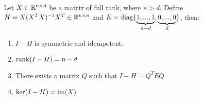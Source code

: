 \begin{lemma} \label{lem:projection properties}
    Let $X \in \mathbb{R}^{n \times d}$ be a matrix of full rank, where $n > d$. Define $H = X (X^TX)^{-1}X^T \in \mathbb{R}^{n \times n}$ and $E = \operatorname{diag} \{\underbrace{1, ..., 1}_{n - d}, \underbrace{0, ..., 0}_{d}\}$, then:
    \begin{enumerate}[label=Property \thelemma.\arabic*, align=left]
        \item \label{prop:idempotent symmetric} $I - H$ is symmetric and idempotent.
        \item \label{prop:rank} $\operatorname{rank}(I - H) = n - d$
        \item \label{prop:identity} There exists a matrix $Q$ such that $I - H = Q^T E Q$
        \item \label{prop:kernel image} $\ker (I - H) = \operatorname{im} (X)$
    \end{enumerate}
\end{lemma}

